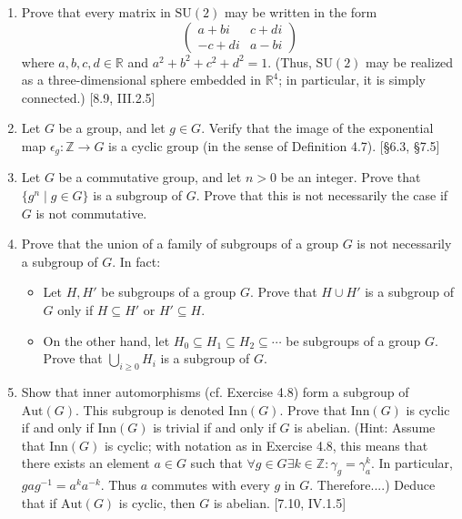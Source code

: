 \begin{enumerate}
    \item Prove that every matrix in $\text{SU}(2)$ may be written in the form
          \[ \begin{pmatrix} a+bi & c+di \\ -c+di & a-bi \end{pmatrix} \]
          where $a, b, c, d \in \mathbb{R}$ and $a^2+b^2+c^2+d^2=1$. (Thus, $\text{SU}(2)$ may be realized as a three-dimensional sphere embedded in $\mathbb{R}^4$; in particular, it is simply connected.) [8.9, III.2.5]

    \item Let $G$ be a group, and let $g \in G$. Verify that the image of the exponential map $\epsilon_g: \mathbb{Z} \to G$ is a cyclic group (in the sense of Definition 4.7). [\S6.3, \S7.5]

    \item Let $G$ be a commutative group, and let $n > 0$ be an integer. Prove that $\{g^n \mid g \in G\}$ is a subgroup of $G$. Prove that this is not necessarily the case if $G$ is not commutative.

    \item Prove that the union of a family of subgroups of a group $G$ is not necessarily a subgroup of $G$. In fact:
          \begin{itemize}
              \item Let $H, H'$ be subgroups of a group $G$. Prove that $H \cup H'$ is a subgroup of $G$ only if $H \subseteq H'$ or $H' \subseteq H$.
              \item On the other hand, let $H_0 \subseteq H_1 \subseteq H_2 \subseteq \cdots$ be subgroups of a group $G$. Prove that $\bigcup_{i \ge 0} H_i$ is a subgroup of $G$.
          \end{itemize}

    \item Show that inner automorphisms (cf. Exercise 4.8) form a subgroup of $\text{Aut}(G)$. This subgroup is denoted $\text{Inn}(G)$. Prove that $\text{Inn}(G)$ is cyclic if and only if $\text{Inn}(G)$ is trivial if and only if $G$ is abelian. (Hint: Assume that $\text{Inn}(G)$ is cyclic; with notation as in Exercise 4.8, this means that there exists an element $a \in G$ such that $\forall g \in G \exists k \in \mathbb{Z}: \gamma_g = \gamma_a^k$. In particular, $gag^{-1} = a^k a^{-k}$. Thus $a$ commutes with every $g$ in $G$. Therefore....) Deduce that if $\text{Aut}(G)$ is cyclic, then $G$ is abelian. [7.10, IV.1.5]


\end{enumerate}
